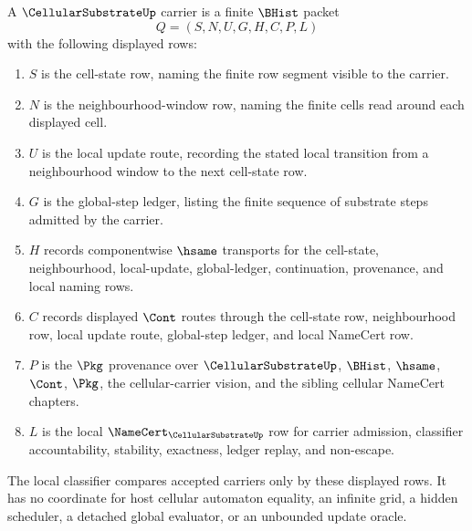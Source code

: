 \begin{definition}
\label{def:cellular-substrate-carrier}
A $\CellularSubstrateUp$ carrier is a finite $\BHist$ packet
$$
Q=(S,N,U,G,H,C,P,L)
$$
with the following displayed rows:
\begin{enumerate}
\item $S$ is the cell-state row, naming the finite row segment visible to the carrier.
\item $N$ is the neighbourhood-window row, naming the finite cells read around each displayed cell.
\item $U$ is the local update route, recording the stated local transition from a neighbourhood window to the next cell-state row.
\item $G$ is the global-step ledger, listing the finite sequence of substrate steps admitted by the carrier.
\item $H$ records componentwise $\hsame$ transports for the cell-state, neighbourhood, local-update, global-ledger, continuation, provenance, and local naming rows.
\item $C$ records displayed $\Cont$ routes through the cell-state row, neighbourhood row, local update route, global-step ledger, and local NameCert row.
\item $P$ is the $\Pkg$ provenance over $\CellularSubstrateUp$, $\BHist$, $\hsame$, $\Cont$, $\Pkg$, the cellular-carrier vision, and the sibling cellular NameCert chapters.
\item $L$ is the local $\NameCert_{\CellularSubstrateUp}$ row for carrier admission, classifier accountability, stability, exactness, ledger replay, and non-escape.
\end{enumerate}
The local classifier compares accepted carriers only by these displayed rows. It has no coordinate for host cellular automaton equality, an infinite grid, a hidden scheduler, a detached global evaluator, or an unbounded update oracle.
\end{definition}

